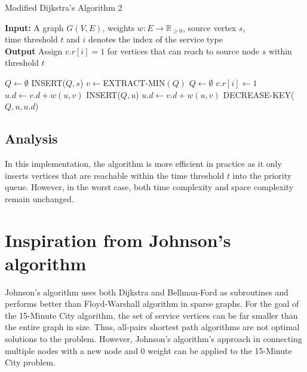 \begin{algorithm}[H]
    \caption{Modified Dijkstra's Algorithm 2} \label{alg:modified_dijsktra2}
    \textbf{Input:} A graph $G(V,E)$, weights $w:E\rightarrow\mathbb{R}_{\geq 0}$, source vertex $s$, \\  time threshold $t$ and $i$ denotes the index of the service type\\
    \textbf{Output} Assign $v.r[i]=1$ for vertices that can reach to source node $s$ within threshold $t$ %
    \begin{algorithmic}
        \State $Q\gets\emptyset$ 
        \State INSERT($Q,s$)
            \State $v\gets$EXTRACT-MIN$(Q)$
                \State $Q\gets\emptyset$ 
            \Else
                \State $v.r[i] \gets 1$
                        \State $u.d\gets v.d+w(u,v)$ %
                        \State INSERT($Q,u$)
                        \State $u.d\gets v.d+w(u,v)$
                        \State DECREASE-KEY($Q,u,u.d$)
                    \EndIf
                \EndFor
            \EndIf
        \EndWhile
    \end{algorithmic}
\end{algorithm}

\subsection{Analysis}

In this implementation, the algorithm is more efficient in practice as it only inserts vertices that are reachable within the time threshold $t$ into the priority queue. However, in the worst case, both time complexity and space complexity remain unchanged.

\section{Inspiration from Johnson's algorithm}

Johnson's algorithm uses both Dijkstra and Bellman-Ford as subroutines and performs better than Floyd-Warshall algorithm in sparse graphs. For the goal of the 15-Minute City algorithm, the set of service vertices can be far smaller than the entire graph in size. Thus, all-pairs shortest path algorithms are not optimal solutions to the problem. However, Johnson's algorithm's approach in connecting multiple nodes with a new node and $0$ weight can be applied to the 15-Minute City problem.

